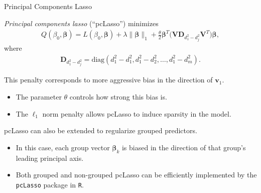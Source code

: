 \documentclass[8pt]{beamer}
\newcommand{\mys}{\vspace{0.5cm} %
}
\begin{document}
\begin{frame}{\color{white} Principal Components Lasso}

\textit{Principal components lasso} (``pcLasso'') minimizes
\begin{align}
    \label{pclasso}
    Q(\beta_0, \bm{\beta}) = L(\beta_0, \bm{\beta}) + \lambda \| \bm{\beta} \|_1 + \frac{\theta}{2} \bm{\beta}^T \Big( \mathbf{V} \mathbf{D}_{d_1^2 - d_j^2} \mathbf{V}^T \Big) \bm{\beta},
\end{align}
where 
\begin{align}
    \label{pclassopenaltymatrix}
    \mathbf{D}_{d_1^2 - d_j^2} = \mathrm{diag}(d_1^2 - d_1^2, d_1^2 - d_2^2, \ldots, d_1^2 - d_m^2).
\end{align} \mys

This penalty corresponds to more aggressive bias in the direction of $\bm{v}_1$.
\begin{itemize}
    \item The parameter $\theta$ controls how strong this bias is.
    \item The $\ell_1$ norm penalty allows pcLasso to induce sparsity in the model.
\end{itemize} \mys

pcLasso can also be extended to regularize grouped predictors.
\begin{itemize}
    \item In this case, each group vector $\bm{\beta}_k$ is biased in the direction of that group's leading principal axis.
    \item Both grouped and non-grouped pcLasso can be efficiently implemented by the \texttt{pcLasso} package in \texttt{R}.
\end{itemize}
    
\end{frame}
\end{document}
